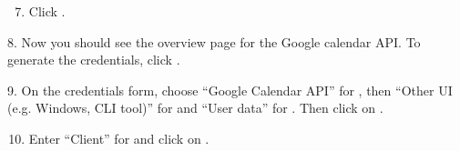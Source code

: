 \documentclass[letterpaper,10pt,english]{sphinxmanual}
\begin{document}
\begin{DUlineblock}{0em}
\item[] 
\end{DUlineblock}
\begin{enumerate}
\setcounter{enumi}{6}
\item {} 
Click .

\end{enumerate}

\begin{figure}[htbp]
\centering
{}\end{figure}

\begin{DUlineblock}{0em}
\item[] 
\end{DUlineblock}

8. Now you should see the overview page for the Google calendar API.
To generate the credentials, click .

\begin{figure}[htbp]
\centering
{}\end{figure}

\begin{DUlineblock}{0em}
\item[] 
\end{DUlineblock}

9. On the credentials form, choose “Google Calendar API” for ,
then “Other UI (e.g. Windows, CLI tool)” for 
and “User data” for . Then click on .

\begin{figure}[htbp]
\centering
{}\end{figure}

\begin{DUlineblock}{0em}
\item[] 
\end{DUlineblock}
\begin{enumerate}
\setcounter{enumi}{9}
\item {} 
Enter “Client” for  and click on .

\end{enumerate}
\end{document}
